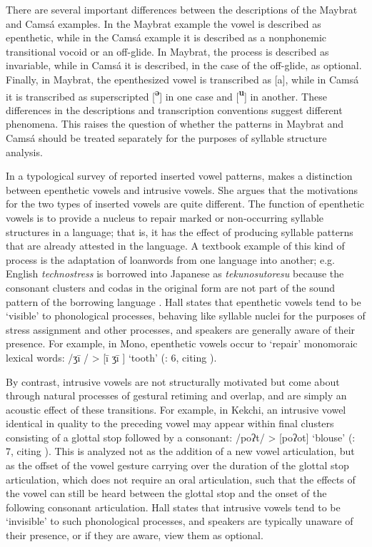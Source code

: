   There are several important differences between the descriptions of the Maybrat and Camsá examples. In the Maybrat example the vowel is described as epenthetic, while in the Camsá example it is described as a nonphonemic transitional vocoid or an off-glide. In Maybrat, the process is described as invariable, while in Camsá it is described, in the case of the off-glide, as optional. Finally, in Maybrat, the epenthesized vowel is transcribed as [a], while in Camsá it is transcribed as superscripted [\textbf{\textsuperscript{ə}}] in one case and [\textbf{\textsuperscript{u}}] in another. These differences in the descriptions and transcription conventions suggest different phenomena. This raises the question of whether the patterns in Maybrat and Camsá should be treated separately for the purposes of syllable structure analysis.



  In a typological survey of reported inserted vowel patterns, \citet{Hall2006} makes a distinction between epenthetic vowels and intrusive vowels. She argues that the motivations for the two types of inserted vowels are quite different. The function of epenthetic vowels is to provide a nucleus to repair marked or non-occurring syllable structures in a language; that is, it has the effect of producing syllable patterns that are already attested in the language. A textbook example of this kind of process is the adaptation of loanwords from one language into another; e.g. English \textit{technostress} is borrowed into Japanese as \textit{tekunosutoresu} because the consonant clusters and codas in the original form are not part of the sound pattern of the borrowing language \citep[69]{Kay1995}. Hall states that epenthetic vowels tend to be ‘visible’ to phonological processes, behaving like syllable nuclei for the purposes of stress assignment and other processes, and speakers are generally aware of their presence. For example, in Mono, epenthetic vowels occur to ‘repair’ monomoraic lexical words: /ʒi\={} / > [i\={} ʒi\={} ] ‘tooth’ (\citealt{Hall2006}: 6, citing \citealt{Olson2003}).



  By contrast, intrusive vowels are not structurally motivated but come about through natural processes of gestural retiming and overlap, and are simply an acoustic effect of these transitions. For example, in Kekchi, an intrusive vowel identical in quality to the preceding vowel may appear within final clusters consisting of a glottal stop followed by a consonant: /poʔt/ > [poʔot] ‘blouse’ (\citealt{Hall2006}: 7, citing \citealt{Campbell1974}). This is analyzed not as the addition of a new vowel articulation, but as the offset of the vowel gesture carrying over the duration of the glottal stop articulation, which does not require an oral articulation, such that the effects of the vowel can still be heard between the glottal stop and the onset of the following consonant articulation. Hall states that intrusive vowels tend to be ‘invisible’ to such phonological processes, and speakers are typically unaware of their presence, or if they are aware, view them as optional.



